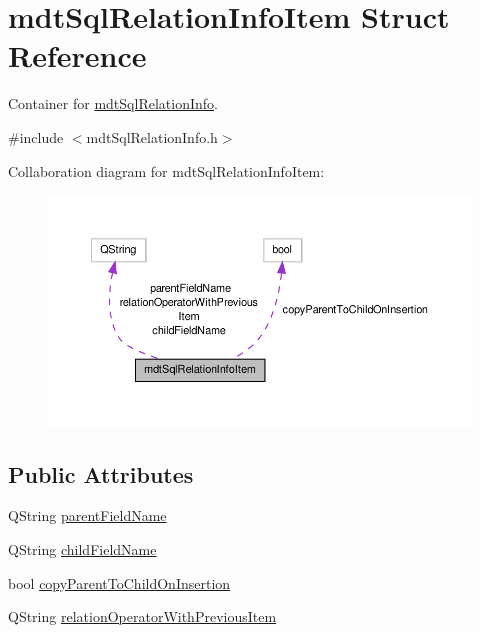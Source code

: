 \hypertarget{structmdt_sql_relation_info_item}{\section{mdt\-Sql\-Relation\-Info\-Item Struct Reference}
\label{structmdt_sql_relation_info_item}
}


Container for \hyperlink{classmdt_sql_relation_info}{mdt\-Sql\-Relation\-Info}.  




{\ttfamily \#include $<$mdt\-Sql\-Relation\-Info.\-h$>$}



Collaboration diagram for mdt\-Sql\-Relation\-Info\-Item\-:\nopagebreak
\begin{figure}[H]
\begin{center}
\leavevmode
\includegraphics[width=350pt]{structmdt_sql_relation_info_item__coll__graph}
\end{center}
\end{figure}
\subsection*{Public Attributes}
\begin{DoxyCompactItemize}
\item 
Q\-String \hyperlink{structmdt_sql_relation_info_item_a2ab8ed9e084a85cc0303b7d983f5e270}{parent\-Field\-Name}
\item 
Q\-String \hyperlink{structmdt_sql_relation_info_item_a472e45de5f24377bb92740ece7f34a07}{child\-Field\-Name}
\item 
bool \hyperlink{structmdt_sql_relation_info_item_ad0c6a47d4463fd80f1696bbfc6c3b402}{copy\-Parent\-To\-Child\-On\-Insertion}
\item 
Q\-String \hyperlink{structmdt_sql_relation_info_item_a30754ae8014357e546d00698d1d79d32}{relation\-Operator\-With\-Previous\-Item}
\end{DoxyCompactItemize}


